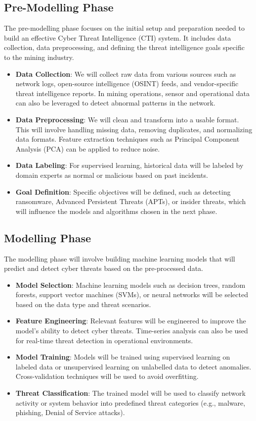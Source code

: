 \documentclass[a4paper,twoside,12pt]{report}
\begin{document}
\subsection{Pre-Modelling Phase}
The pre-modelling phase focuses on the initial setup and preparation needed to build an effective Cyber Threat Intelligence (CTI) system. It includes data collection, data preprocessing, and defining the threat intelligence goals specific to the mining industry.

\begin{itemize}
    \item \textbf{Data Collection}: We will collect raw data from various sources such as network logs, open-source intelligence (OSINT) feeds, and vendor-specific threat intelligence reports. In mining operations, sensor and operational data can also be leveraged to detect abnormal patterns in the network.
    \item \textbf{Data Preprocessing}: We will clean and transform into a usable format. This will involve handling missing data, removing duplicates, and normalizing data formats. Feature extraction techniques such as Principal Component Analysis (PCA) can be applied to reduce noise.
    \item \textbf{Data Labeling}: For supervised learning, historical data will be labeled by domain experts as normal or malicious based on past incidents.
    \item \textbf{Goal Definition}: Specific objectives will be defined, such as detecting ransomware, Advanced Persistent Threats (APTs), or insider threats, which will influence the models and algorithms chosen in the next phase.
\end{itemize}

\subsection{Modelling Phase}
The modelling phase will involve building machine learning models that will predict and detect cyber threats based on the pre-processed data.

\begin{itemize}
    \item \textbf{Model Selection}: Machine learning models such as decision trees, random forests, support vector machines (SVMs), or neural networks will be selected based on the data type and threat scenarios.
    \item \textbf{Feature Engineering}: Relevant features will be engineered to improve the model’s ability to detect cyber threats. Time-series analysis can also be used for real-time threat detection in operational environments.
    \item \textbf{Model Training}: Models will be trained using supervised learning on labeled data or unsupervised learning on unlabelled data to detect anomalies. Cross-validation techniques will be used to avoid overfitting.
    \item \textbf{Threat Classification}: The trained model will be used to classify network activity or system behavior into predefined threat categories (e.g., malware, phishing, Denial of Service attacks).
\end{itemize}
\end{document}
